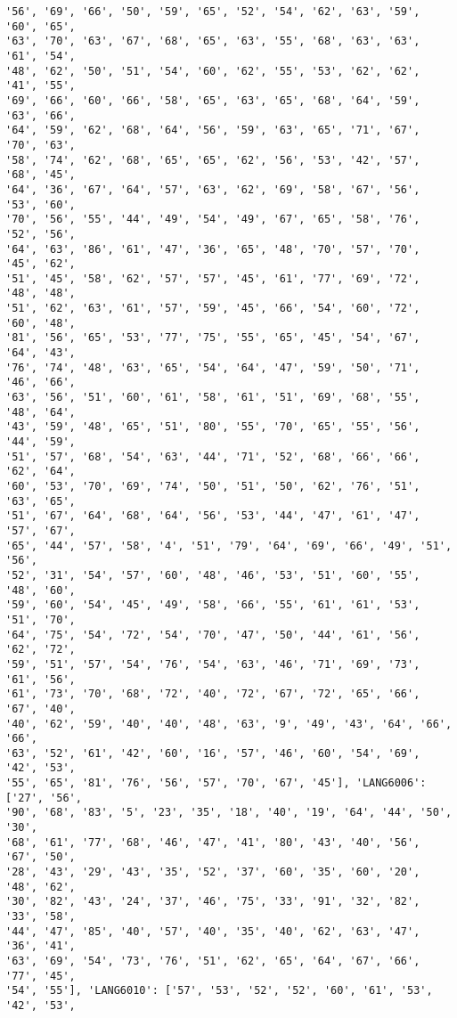 \documentclass[11pt]{article}
\begin{document}
\begin{Verbatim}[commandchars=\\\{\}]
'56', '69', '66', '50', '59', '65', '52', '54', '62', '63', '59', '60', '65',
'63', '70', '63', '67', '68', '65', '63', '55', '68', '63', '63', '61', '54',
'48', '62', '50', '51', '54', '60', '62', '55', '53', '62', '62', '41', '55',
'69', '66', '60', '66', '58', '65', '63', '65', '68', '64', '59', '63', '66',
'64', '59', '62', '68', '64', '56', '59', '63', '65', '71', '67', '70', '63',
'58', '74', '62', '68', '65', '65', '62', '56', '53', '42', '57', '68', '45',
'64', '36', '67', '64', '57', '63', '62', '69', '58', '67', '56', '53', '60',
'70', '56', '55', '44', '49', '54', '49', '67', '65', '58', '76', '52', '56',
'64', '63', '86', '61', '47', '36', '65', '48', '70', '57', '70', '45', '62',
'51', '45', '58', '62', '57', '57', '45', '61', '77', '69', '72', '48', '48',
'51', '62', '63', '61', '57', '59', '45', '66', '54', '60', '72', '60', '48',
'81', '56', '65', '53', '77', '75', '55', '65', '45', '54', '67', '64', '43',
'76', '74', '48', '63', '65', '54', '64', '47', '59', '50', '71', '46', '66',
'63', '56', '51', '60', '61', '58', '61', '51', '69', '68', '55', '48', '64',
'43', '59', '48', '65', '51', '80', '55', '70', '65', '55', '56', '44', '59',
'51', '57', '68', '54', '63', '44', '71', '52', '68', '66', '66', '62', '64',
'60', '53', '70', '69', '74', '50', '51', '50', '62', '76', '51', '63', '65',
'51', '67', '64', '68', '64', '56', '53', '44', '47', '61', '47', '57', '67',
'65', '44', '57', '58', '4', '51', '79', '64', '69', '66', '49', '51', '56',
'52', '31', '54', '57', '60', '48', '46', '53', '51', '60', '55', '48', '60',
'59', '60', '54', '45', '49', '58', '66', '55', '61', '61', '53', '51', '70',
'64', '75', '54', '72', '54', '70', '47', '50', '44', '61', '56', '62', '72',
'59', '51', '57', '54', '76', '54', '63', '46', '71', '69', '73', '61', '56',
'61', '73', '70', '68', '72', '40', '72', '67', '72', '65', '66', '67', '40',
'40', '62', '59', '40', '40', '48', '63', '9', '49', '43', '64', '66', '66',
'63', '52', '61', '42', '60', '16', '57', '46', '60', '54', '69', '42', '53',
'55', '65', '81', '76', '56', '57', '70', '67', '45'], 'LANG6006': ['27', '56',
'90', '68', '83', '5', '23', '35', '18', '40', '19', '64', '44', '50', '30',
'68', '61', '77', '68', '46', '47', '41', '80', '43', '40', '56', '67', '50',
'28', '43', '29', '43', '35', '52', '37', '60', '35', '60', '20', '48', '62',
'30', '82', '43', '24', '37', '46', '75', '33', '91', '32', '82', '33', '58',
'44', '47', '85', '40', '57', '40', '35', '40', '62', '63', '47', '36', '41',
'63', '69', '54', '73', '76', '51', '62', '65', '64', '67', '66', '77', '45',
'54', '55'], 'LANG6010': ['57', '53', '52', '52', '60', '61', '53', '42', '53',

\end{Verbatim}
\end{document}
